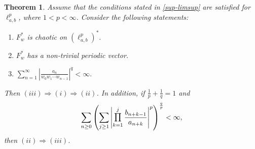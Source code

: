 \documentclass[12pt, reqno]{amsart}
\DeclareMathOperator*{\Mprod}{\text{\raisebox{0.25ex}{\scalebox{0.8}{$\prod$}}}}
\newtheorem{theorem}{Theorem}[section]
\theoremstyle{definition}
\theoremstyle{remark}
\numberwithin{equation}{section}
\begin{document}
\begin{theorem}\label{unilateral1}
     Assume that the conditions stated in \eqref{sup-limsup} are satisfied for $\ell^p_{a,b}$, where $1<p<\infty$. Consider the following statements:
     \begin{enumerate}
\item[(i)]$F_{w}^{*}$ is chaotic on $(\ell^{p}_{a,b})^{*}.$
\item[(ii)] $F_{w}^{*}$   has a non-trivial periodic vector.
\item[(iii)] $\sum_{n=1}^{\infty}\left\lvert \frac{a_{n}}{w_{0}w_{1}\cdots w_{n-1}} \right\rvert^{q} < \infty.$ 
\end{enumerate}

Then $(iii)\Rightarrow (i)\Rightarrow (ii)$. In addition, if $\frac{1}{p}+\frac{1}{q}=1$ and
\[
       \sum_{n\geq0}\left(\sum_{j\geq 1}\left\lvert \Mprod_{k=1}^{j}\frac{b_{n+k-1}}{ a_{n+k}}\right\rvert^{p}\right)^{\frac{q}{p}}<\infty,
      \]
      then $(ii)\Rightarrow (iii)$.
\end{theorem}
\end{document}
